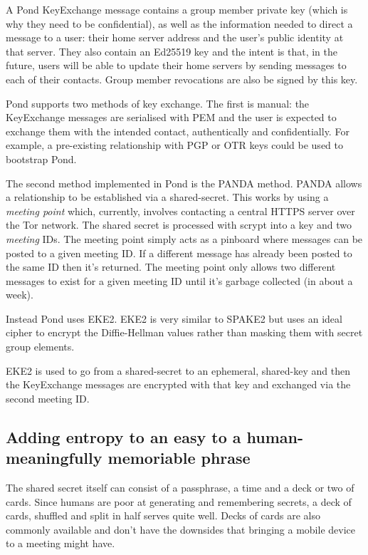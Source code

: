 \documentclass[letterpaper,twocolumn,10pt]{article}
\begin{document}
A Pond KeyExchange message contains a group member private key (which is why
they need to be confidential), as well as the information needed to direct a
message to a user: their home server address and the user's public identity at
that server.  They also contain an Ed25519 key and the intent is that, in the
future, users will be able to update their home servers by sending messages to
each of their contacts. Group member revocations are also be signed by this
key.

Pond supports two methods of key exchange. The first is manual: the
KeyExchange messages are serialised with PEM and the user is expected to
exchange them with the intended contact, authentically and confidentially. For
example, a pre-existing relationship with PGP or OTR keys could be used to
bootstrap Pond.

The second method implemented\cite{panda} in Pond is the PANDA method. PANDA
allows a relationship to be established via a shared-secret. This works by
using a {\it meeting point} which, currently, involves contacting a
central HTTPS server over the Tor network. The shared secret is processed with
scrypt\cite{scrypt} into a key and two {\it meeting} IDs. The meeting point
simply acts as a pinboard where messages can be posted to a given meeting ID.
If a different message has already been posted to the same ID then it's
returned. The meeting point only allows two different messages to exist for a
given meeting ID until it's garbage collected (in about a week).

Instead Pond uses EKE2. EKE2 is very similar to SPAKE2 but uses an ideal cipher
to encrypt the Diffie-Hellman values rather than masking them with secret group
elements.

EKE2 is used to go from a shared-secret to an ephemeral, shared-key and then
the KeyExchange messages are encrypted with that key and exchanged via the
second meeting ID.

\subsection{Adding entropy to an easy to a human-meaningfully memoriable phrase}

The shared secret itself can consist of a passphrase, a time and a deck or two
of cards. Since humans are poor at generating and remembering secrets, a deck
of cards, shuffled and split in half serves quite well. Decks of cards are also
commonly available and don't have the downsides that bringing a mobile device
to a meeting might have.
\end{document}
